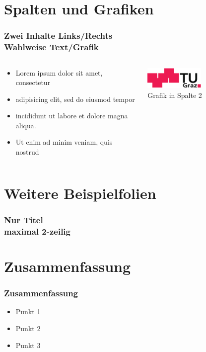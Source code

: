 \documentclass{beamer}
\begin{document}
\section{Spalten und Grafiken}
\begin{frame}
	\frametitle{Zwei Inhalte Links/Rechts\\Wahlweise Text/Grafik}
	\begin{columns}[onlytextwidth]
		\begin{column}{0.5\textwidth}
			\begin{itemize}
				\item Lorem ipsum dolor sit amet, consectetur 
				\item adipisicing elit, sed do eiusmod tempor 
				\item incididunt ut labore et dolore magna aliqua. 
				\item Ut enim ad minim veniam, quis nostrud 
			\end{itemize}
		\end{column}
		\begin{column}{0.5\textwidth}
			\begin{center}
			\includegraphics[width=0.5\textwidth]{logo.pdf}\\
			Grafik in Spalte 2
			\end{center}
		\end{column}
	\end{columns}
\end{frame}

\section{Weitere Beispielfolien}

\begin{frame}
	\frametitle{Nur Titel \\maximal 2-zeilig}
\end{frame}


\section{Zusammenfassung}

\begin{frame}
	\frametitle{Zusammenfassung}
	\begin{itemize}
		\item Punkt 1
		\item Punkt 2
		\item Punkt 3
	\end{itemize}
\end{frame}

\end{document}
